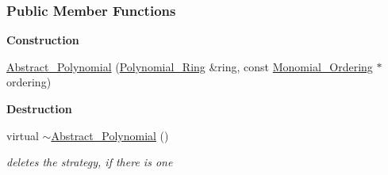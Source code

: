 \subsubsection*{Public Member Functions}
\begin{Indent}\textbf{ Construction}\par
\begin{DoxyCompactItemize}
\item 
\hyperlink{group__polygroup_af72cda5555005f99c9844fece4e5ca46}{Abstract\+\_\+\+Polynomial} (\hyperlink{group__polygroup_class_polynomial___ring}{Polynomial\+\_\+\+Ring} \&ring, const \hyperlink{group__orderinggroup_class_monomial___ordering}{Monomial\+\_\+\+Ordering} $\ast$ordering)
\end{DoxyCompactItemize}
\end{Indent}
\begin{Indent}\textbf{ Destruction}\par
\begin{DoxyCompactItemize}
\item 
\mbox{\label{group__polygroup_a5082a214ab62d3d5aad6d294926be8e2}} 
virtual \hyperlink{group__polygroup_a5082a214ab62d3d5aad6d294926be8e2}{$\sim$\+Abstract\+\_\+\+Polynomial} ()
\begin{DoxyCompactList}\small\item\em deletes the strategy, if there is one \end{DoxyCompactList}\end{DoxyCompactItemize}
\end{Indent}

